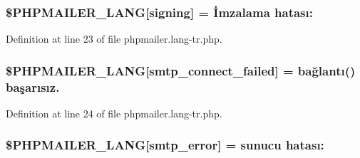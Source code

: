 \subsubsection[{\texorpdfstring{\$\+P\+H\+P\+M\+A\+I\+L\+E\+R\+\_\+\+L\+A\+NG}{$PHPMAILER_LANG}}]{\setlength{\rightskip}{0pt plus 5cm}\$P\+H\+P\+M\+A\+I\+L\+E\+R\+\_\+\+L\+A\+NG\mbox{[}\textquotesingle{}signing\textquotesingle{}\mbox{]} = \textquotesingle{}İmzalama hatası\+: \textquotesingle{}}\hypertarget{phpmailer_8lang-tr_8php_a68e437bdb9b968a5a67320f03d231565}{}\label{phpmailer_8lang-tr_8php_a68e437bdb9b968a5a67320f03d231565}


Definition at line 23 of file phpmailer.\+lang-\/tr.\+php.

\subsubsection[{\texorpdfstring{\$\+P\+H\+P\+M\+A\+I\+L\+E\+R\+\_\+\+L\+A\+NG}{$PHPMAILER_LANG}}]{\setlength{\rightskip}{0pt plus 5cm}\$P\+H\+P\+M\+A\+I\+L\+E\+R\+\_\+\+L\+A\+NG\mbox{[}\textquotesingle{}smtp\+\_\+connect\+\_\+failed\textquotesingle{}\mbox{]} =  bağlantı() başarısız.\textquotesingle{}}\hypertarget{phpmailer_8lang-tr_8php_a7b321d4ca1e9df702403ed4c61aa0980}{}\label{phpmailer_8lang-tr_8php_a7b321d4ca1e9df702403ed4c61aa0980}


Definition at line 24 of file phpmailer.\+lang-\/tr.\+php.

\subsubsection[{\texorpdfstring{\$\+P\+H\+P\+M\+A\+I\+L\+E\+R\+\_\+\+L\+A\+NG}{$PHPMAILER_LANG}}]{\setlength{\rightskip}{0pt plus 5cm}\$P\+H\+P\+M\+A\+I\+L\+E\+R\+\_\+\+L\+A\+NG\mbox{[}\textquotesingle{}smtp\+\_\+error\textquotesingle{}\mbox{]} =  sunucu hatası\+: \textquotesingle{}}\hypertarget{phpmailer_8lang-tr_8php_a7d9cffba1e669c845f8a4c891ee50064}{}\label{phpmailer_8lang-tr_8php_a7d9cffba1e669c845f8a4c891ee50064}


